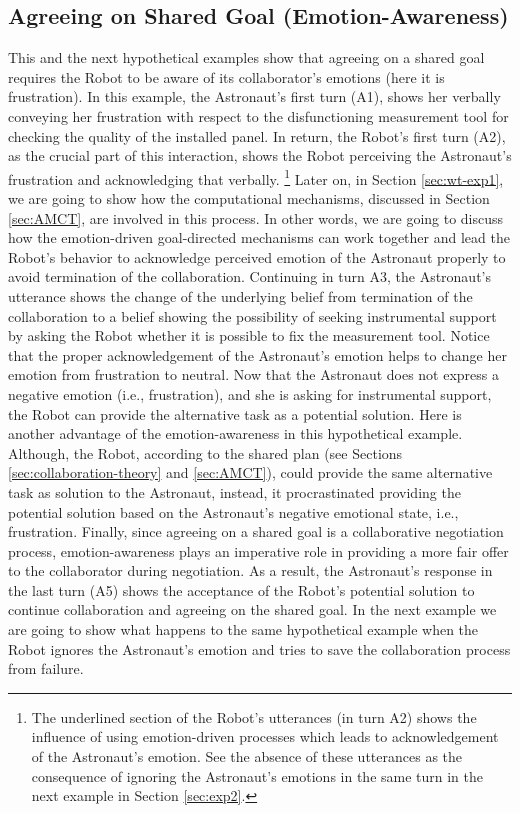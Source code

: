 \subsection{Agreeing on Shared Goal (Emotion-Awareness)}
\label{sec:exp1}

This and the next hypothetical examples show that agreeing on a shared goal
requires the Robot to be aware of its collaborator's emotions (here it is
frustration). In this example, the Astronaut's first turn (A1), shows her
verbally conveying her frustration with respect to the disfunctioning
measurement tool for checking the quality of the installed panel. In return, the
Robot's first turn (A2), as the crucial part of this interaction, shows the
Robot perceiving the Astronaut's frustration and acknowledging that verbally.
\footnote{The underlined section of the Robot's utterances (in turn A2) shows
the influence of using emotion-driven processes which leads to acknowledgement
of the Astronaut's emotion. See the absence of these utterances as
the consequence of ignoring the Astronaut's emotions in the same turn in the
next example in Section \ref{sec:exp2}.} Later on, in Section \ref{sec:wt-exp1},
we are going to show how the computational mechanisms, discussed in Section
\ref{sec:AMCT}, are involved in this process. In other words, we are going to
discuss how the emotion-driven goal-directed mechanisms can work together and
lead the Robot's behavior to acknowledge perceived emotion of the Astronaut
properly to avoid termination of the collaboration. Continuing in turn A3, the
Astronaut's utterance shows the change of the underlying belief from termination
of the collaboration to a belief showing the possibility of seeking instrumental
support by asking the Robot whether it is possible to fix the measurement tool.
Notice that the proper acknowledgement of the Astronaut's emotion helps to
change her emotion from frustration to neutral. Now that the Astronaut does not
express a negative emotion (i.e., frustration), and she is asking for
instrumental support, the Robot can provide the alternative task as a potential
solution. Here is another advantage of the emotion-awareness in this
hypothetical example. Although, the Robot, according to the shared plan (see
Sections \ref{sec:collaboration-theory} and \ref{sec:AMCT}), could provide the
same alternative task as solution to the Astronaut, instead, it procrastinated
providing the potential solution based on the Astronaut's negative emotional
state, i.e., frustration. Finally, since agreeing on a shared goal is a
collaborative negotiation process, emotion-awareness plays an imperative role in
providing a more fair offer to the collaborator during negotiation. As a result,
the Astronaut's response in the last turn (A5) shows the acceptance of the
Robot's potential solution to continue collaboration and agreeing on the shared
goal. In the next example we are going to show what happens to the same
hypothetical example when the Robot ignores the Astronaut's emotion and tries to
save the collaboration process from failure.\\

